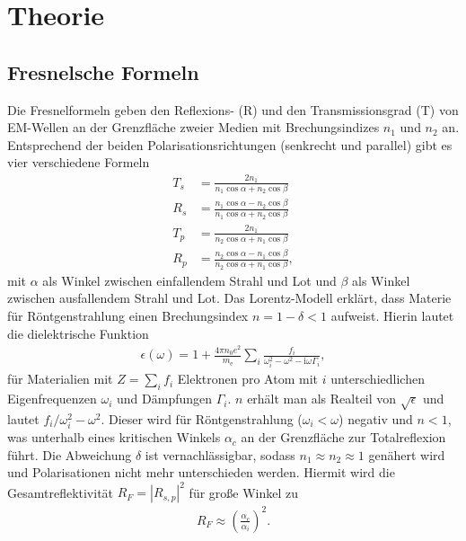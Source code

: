 

\section{Theorie}
\subsection{Fresnelsche Formeln}
Die Fresnelformeln geben den Reflexions- (R) und den Transmissionsgrad (T) von EM-Wellen an der Grenzfläche zweier Medien mit Brechungsindizes $n_1$ und $n_2$ an.
Entsprechend der beiden Polarisationsrichtungen (senkrecht und parallel) gibt es vier verschiedene Formeln
\begin{align}
 T_s &= \frac{2n_1}{n_1 \cos\alpha + n_2\cos\beta}\\
 R_s &= \frac{n_1 \cos\alpha - n_2\cos\beta}{n_1 \cos\alpha + n_2\cos\beta}\\
 T_p &= \frac{2n_1}{n_2 \cos\alpha + n_1\cos\beta}\\
 R_p &= \frac{n_2 \cos\alpha - n_1\cos\beta}{n_2 \cos\alpha + n_1\cos\beta},
\end{align}
\noindent mit $\alpha$ als Winkel zwischen einfallendem Strahl und Lot und $\beta$ als Winkel zwischen ausfallendem Strahl und Lot. Das Lorentz-Modell erklärt,
dass Materie für Röntgenstrahlung einen Brechungsindex $n = 1-\delta <1$ aufweist. Hierin lautet die dielektrische Funktion
\begin{align}
 \epsilon(\omega) = 1 + \frac{4\pi n_0 e^2}{m_\text{e}} \sum\limits_i \frac{f_i}{\omega_i^2 - \omega^2 - \text{i}\omega\Gamma_i},
\end{align}
für Materialien mit $Z=\sum_i f_i$ Elektronen pro Atom mit $i$ unterschiedlichen Eigenfrequenzen $\omega_i$ und Dämpfungen $\Gamma_i$. $n$ erhält man als
Realteil von $\sqrt{\epsilon}$ und lautet $f_i / \omega_i^2 - \omega^2$. Dieser wird für Röntgenstrahlung ($\omega_i <\omega$) negativ und $n<1$, was
unterhalb eines kritischen Winkels $\alpha_c$ an der Grenzfläche zur Totalreflexion führt. Die Abweichung $\delta$ ist vernachlässigbar, sodass 
$n_1 \approx n_2 \approx 1$ genähert wird und Polarisationen nicht mehr unterschieden werden. Hiermit wird die Gesamtreflektivität $R_F = |R_{s,p}|^2$ für
große Winkel zu
\begin{align}
 R_F \approx \left(\frac{\alpha_c}{\alpha_i}\right)^2.
\end{align}

